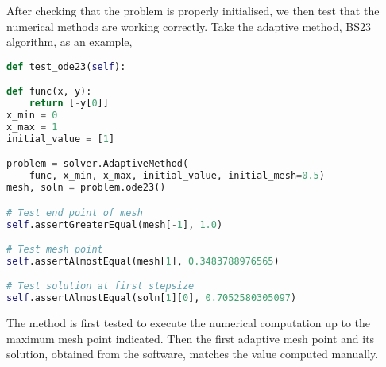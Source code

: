 After checking that the problem is properly initialised, we then test that the numerical methods are working correctly. Take the adaptive method, BS23 algorithm, as an example, 
\begin{lstlisting}[language=Python]
def test_ode23(self):

def func(x, y):
    return [-y[0]]
x_min = 0
x_max = 1
initial_value = [1]

problem = solver.AdaptiveMethod(
    func, x_min, x_max, initial_value, initial_mesh=0.5)
mesh, soln = problem.ode23()

# Test end point of mesh
self.assertGreaterEqual(mesh[-1], 1.0)

# Test mesh point
self.assertAlmostEqual(mesh[1], 0.3483788976565)

# Test solution at first stepsize
self.assertAlmostEqual(soln[1][0], 0.7052580305097)
\end{lstlisting}
The method is first tested to execute the numerical computation up to the maximum mesh point indicated. Then the first adaptive mesh point and its solution, obtained from the software, matches the value computed manually. 
